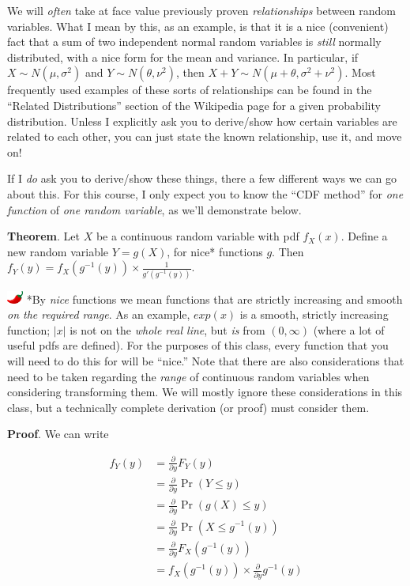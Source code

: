 \documentclass[
  letterpaper,
  DIV=11,
  numbers=noendperiod]{scrreprt}
\begin{document}
We will \emph{often} take at face value previously proven
\emph{relationships} between random variables. What I mean by this, as
an example, is that it is a nice (convenient) fact that a sum of two
independent normal random variables is \emph{still} normally
distributed, with a nice form for the mean and variance. In particular,
if \(X \sim N(\mu, \sigma^2)\) and \(Y \sim N(\theta, \nu^2)\), then
\(X + Y \sim N(\mu + \theta, \sigma^2 + \nu^2)\). Most frequently used
examples of these sorts of relationships can be found in the ``Related
Distributions'' section of the Wikipedia page for a given probability
distribution. Unless I explicitly ask you to derive/show how certain
variables are related to each other, you can just state the known
relationship, use it, and move on!

If I \emph{do} ask you to derive/show these things, there a few
different ways we can go about this. For this course, I only expect you
to know the ``CDF method'' for \emph{one function} of \emph{one random
variable}, as we'll demonstrate below.

\textbf{Theorem}. Let \(X\) be a continuous random variable with pdf
\(f_X(x)\). Define a new random variable \(Y = g(X)\), for nice*
functions \(g\). Then
\(f_Y(y) = f_X(g^{-1}(y)) \times \frac{1}{g'(g^{-1}(y))}\).

\includegraphics[width=0.20833in,height=0.16667in]{images/chilipepper.png}
*By \emph{nice} functions we mean functions that are strictly increasing
and smooth \emph{on the required range}. As an example, \(exp(x)\) is a
smooth, strictly increasing function; \(|x|\) is not on the \emph{whole
real line}, but \emph{is} from \((0, \infty)\) (where a lot of useful
pdfs are defined). For the purposes of this class, every function that
you will need to do this for will be ``nice.'' Note that there are also
considerations that need to be taken regarding the \emph{range} of
continuous random variables when considering transforming them. We will
mostly ignore these considerations in this class, but a technically
complete derivation (or proof) must consider them.

\textbf{Proof}. We can write

\begin{align*}
    f_Y(y) & = \frac{\partial}{\partial y} F_Y(y) \\
    & = \frac{\partial}{\partial y} \Pr(Y \leq y) \\
    & = \frac{\partial}{\partial y} \Pr(g(X) \leq y) \\
    & = \frac{\partial}{\partial y} \Pr(X \leq g^{-1}(y)) \\
    & = \frac{\partial}{\partial y} F_X(g^{-1}(y)) \\
    & = f_X(g^{-1}(y)) \times \frac{\partial}{\partial y} g^{-1}(y) 
\end{align*}
\end{document}
